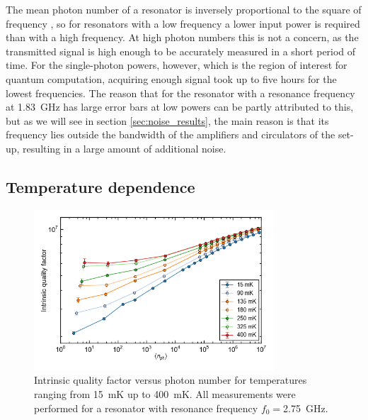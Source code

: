 The mean photon number of a resonator is inversely proportional to the square of frequency \cite{DRIE}, so for resonators with a low frequency a lower input power is required than with a high frequency. At high photon numbers this is not a concern, as the transmitted signal is high enough to be accurately measured in a short period of time. For the single-photon powers, however, which is the region of interest for quantum computation, acquiring enough signal took up to five hours for the lowest frequencies. The reason that for the resonator with a resonance frequency at \SI{1.83}{\giga \hertz} has large error bars at low powers can be partly attributed to this, but as we will see in section \ref{sec:noise_results}, the main reason is that its frequency lies outside the bandwidth of the amplifiers and circulators of the set-up, resulting in a large amount of additional noise.





\subsection{Temperature dependence}
\label{sec:resonator:results:emperature_dependence}
\begin{figure}
    \centering
    \includegraphics[width=0.8\textwidth]{Figures/DRIE/Qi_vs_n_photon_temperature_dependence.png}
    \caption{Intrinsic quality factor versus photon number for temperatures ranging from \SI{15}{\milli \kelvin} up to \SI{400}{\milli \kelvin}. All measurements were performed for a resonator with resonance frequency $f_0 = $\SI{2.75}{\giga \hertz}.}
    \label{fig:Qi_vs_n_photon_temperature_dependence}
\end{figure}

